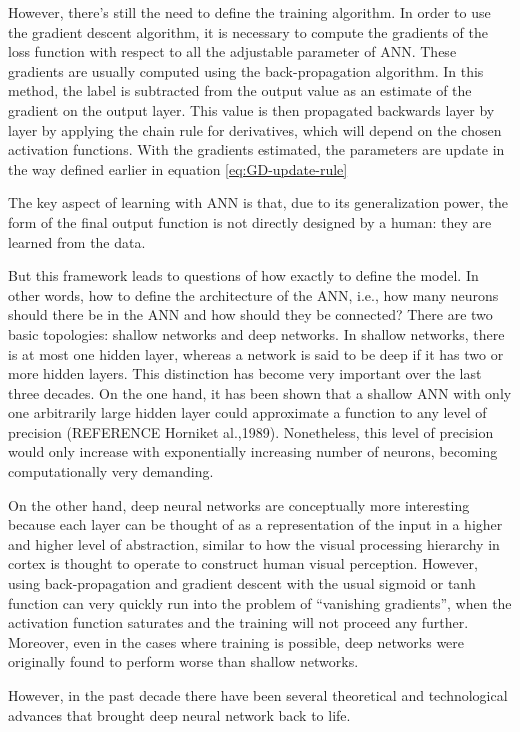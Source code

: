 \documentclass{article}
\begin{document}
However, there's still the need to define the training algorithm. In order to use the gradient descent algorithm, it is necessary to compute the gradients of the loss function with respect to all the adjustable parameter of ANN. These gradients are usually computed using the back-propagation algorithm. In this method, the label is subtracted from the output value as an estimate of the gradient on the output layer. This value is then propagated backwards layer by layer by applying the chain rule for derivatives, which will depend on the chosen activation functions. With the gradients estimated, the parameters are update in the way defined earlier in equation \ref{eq:GD-update-rule}

The key aspect of learning with ANN is that, due to its generalization power, the form of the final output function is not directly designed by a human: they are learned from the data.

But this framework leads to questions of how exactly to define the model. In other words, how to define the architecture of the ANN, i.e., how many neurons should there be in the ANN and how should they be connected? There are two basic topologies: shallow networks and deep networks. In shallow networks, there is at most one hidden layer, whereas a network is said to be deep if it has two or more hidden layers. This distinction has become very important over the last three decades. On the one hand, it has been shown that a shallow ANN with only one arbitrarily large hidden layer could approximate a function to any level of precision (REFERENCE Horniket al.,1989). Nonetheless, this level of precision would only increase with exponentially increasing number of neurons, becoming computationally very demanding.

On the other hand, deep neural networks are conceptually more interesting because each layer can be thought of as a representation of the input in a higher and higher level of abstraction, similar to how the visual processing hierarchy in cortex is thought to operate to construct human visual perception. However, using back-propagation and gradient descent with the usual sigmoid or tanh function can very quickly run into the problem of “vanishing gradients”, when the activation function saturates and the training will not proceed any further. Moreover, even in the cases where training is possible, deep networks were originally found to perform worse than shallow networks.

However, in the past decade there have been several theoretical and technological advances that brought deep neural network back to life.
\end{document}
